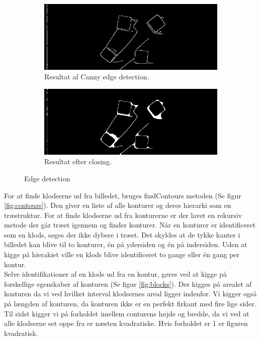 \begin{figure}[H]
	\centering
	\begin{subfigure}{.45\textwidth}
		\centering
		\includegraphics[scale=0.3]{images/canny}
		\caption{Resultat af Canny edge detection.}
	  	\label{fig:canny}
	\end{subfigure}
	\begin{subfigure}{.45\textwidth}
		\centering
		\includegraphics[scale=0.3]{images/closed}
		\caption{Resultat efter closing.}
		\label{fig:close}
	\end{subfigure}
	\caption{Edge detection}
	\label{fig:edges}
\end{figure}

For at finde klodserne ud fra billedet, bruges findContours metoden (Se figur \ref{fig:contours}).
Den giver en liste af alle konturer og deres hierarki som en træstruktur.
For at finde klodserne ud fra konturerne er der lavet en rekursiv metode der går træet igennem og finder konturer.
Når en konturer er identificeret som en klods, søges der ikke dybere i træet.
Det skyldes at de tykke kanter i billedet kan blive til to konturer, én på ydersiden og én på indersiden.
Uden at kigge på hierakiet ville en klods blive identificeret to gange eller én gang per kontur. \\

Selve identifikationer af en klods ud fra en kontur, gøres ved at kigge på forskellige egenskaber af konturen (Se figur \ref{fig:blocks}).
Der kigges på arealet af konturen da vi ved hvilket interval klodsernes areal ligger indenfor.
Vi kigger også på længden af konturen, da konturen ikke er en perfekt firkant med fire lige sider.
Til sidst kigger vi på forholdet imellem conturens højde og bredde, da vi ved at alle klodserne set oppe fra er næsten kvadratiske.
Hvis forholdet er 1 er figuren kvadratisk.

